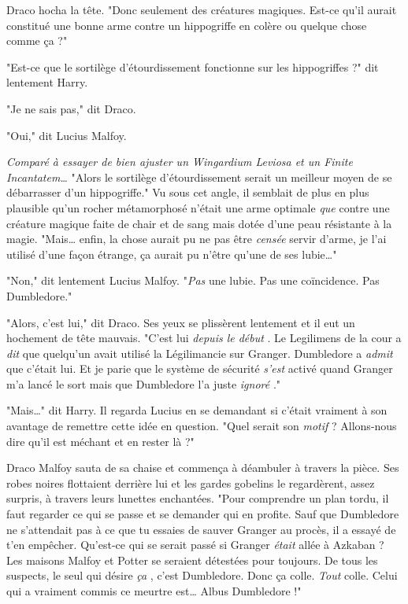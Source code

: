 Draco hocha la tête. "Donc seulement des créatures magiques. Est-ce qu'il aurait constitué une bonne arme contre un hippogriffe en colère ou quelque chose comme ça ?"

"Est-ce que le sortilège d'étourdissement fonctionne sur les hippogriffes ?" dit lentement Harry.

"Je ne sais pas," dit Draco.

"Oui," dit Lucius Malfoy.

\emph{Comparé à essayer de bien ajuster un Wingardium Leviosa et un Finite Incantatem…}  "Alors le sortilège d'étourdissement serait un meilleur moyen de se débarrasser d'un hippogriffe." Vu sous cet angle, il semblait de plus en plus plausible qu'un rocher métamorphosé n'était une arme optimale \emph{que}  contre une créature magique faite de chair et de sang mais dotée d'une peau résistante à la magie. "Mais… enfin, la chose aurait pu ne pas être \emph{censée}  servir d'arme, je l'ai utilisé d'une façon étrange, ça aurait pu n'être qu'une de ses lubie…"

"Non," dit lentement Lucius Malfoy. "\emph{Pas}  une lubie. Pas une coïncidence. Pas Dumbledore."

"Alors, c'est lui," dit Draco. Ses yeux se plissèrent lentement et il eut un hochement de tête mauvais. "C'est lui \emph{depuis le début} . Le Legilimens de la cour a \emph{dit}  que quelqu'un avait utilisé la Légilimancie sur Granger. Dumbledore a \emph{admit}  que c'était lui. Et je parie que le système de sécurité \emph{s'est}  activé quand Granger m'a lancé le sort mais que Dumbledore l'a juste \emph{ignoré} ."

"Mais…" dit Harry. Il regarda Lucius en se demandant si c'était vraiment à son avantage de remettre cette idée en question. "Quel serait son \emph{motif}  ? Allons-nous dire qu'il est méchant et en rester là ?"

Draco Malfoy sauta de sa chaise et commença à déambuler à travers la pièce. Ses robes noires flottaient derrière lui et les gardes gobelins le regardèrent, assez surpris, à travers leurs lunettes enchantées. "Pour comprendre un plan tordu, il faut regarder ce qui se passe et se demander qui en profite. Sauf que Dumbledore ne s'attendait pas à ce que tu essaies de sauver Granger au procès, il a essayé de t'en empêcher. Qu'est-ce qui se serait passé si Granger \emph{était}  allée à Azkaban ? Les maisons Malfoy et Potter se seraient détestées pour toujours. De tous les suspects, le seul qui désire \emph{ça} , c'est Dumbledore. Donc ça colle. \emph{Tout}  colle. Celui qui a vraiment commis ce meurtre est… Albus Dumbledore !"

